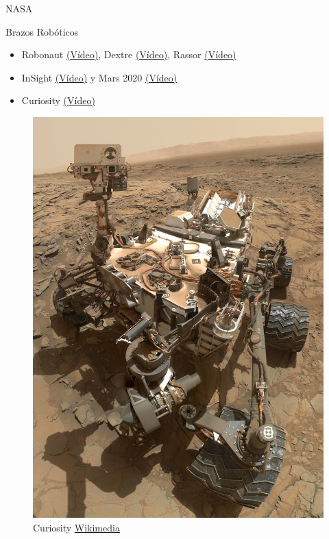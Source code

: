 \begin{frame}[fragile]{NASA}
\vspace{10px}
\pause
{}
\begin{block}{Brazos Robóticos}
	\begin{itemize}
		\item Robonaut \href{https://www.youtube.com/watch?v=JLU0c0mmvxg}{(Vídeo)}, Dextre \href{https://www.youtube.com/watch?v=AXQ6iSFVwrk}{(Vídeo)}, Rassor \href{https://www.youtube.com/watch?v=d3zRvl2LYJ4}{(Vídeo)}
		\pause
		\item InSight \href{https://www.youtube.com/watch?v=LKLITDmm4NA}{(Vídeo)} y Mars 2020 \href{https://www.youtube.com/watch?v=iZCRFRgSgas&t=327s}{(Vídeo)}
		\pause
		\item Curiosity \href{https://www.youtube.com/watch?v=P4boyXQuUIw}{(Vídeo)}
	\end{itemize}
\end{block}
\begin{figure}
	\centering
	\pause
	\includegraphics[scale=0.019]{./EtapaModerna/Imagenes/curiosity.jpg}
	\caption{Curiosity \href{https://en.wikipedia.org/wiki/File:Curiosity_Self-Portrait_at_\%27Big_Sky\%27_Drilling_Site.jpg}{Wikimedia}}
\end{figure}
\end{frame}

